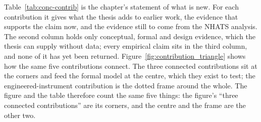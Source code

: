 Table~\ref{tab:conc-contrib} is the chapter's statement of what is new. For each
contribution it gives what the thesis adds to earlier work, the evidence that
supports the claim now, and the evidence still to come from the NHATS analysis.
The second column holds only conceptual, formal and design evidence, which the
thesis can supply without data; every empirical claim sits in the third column,
and none of it has yet been returned. Figure~\ref{fig:contribution_triangle}
shows how the same five contributions connect. The three connected contributions
sit at the corners and feed the formal model at the centre, which they exist to
test; the engineered-instrument contribution is the dotted frame around the
whole. The figure and the table therefore count the same five things: the
figure's ``three connected contributions'' are its corners, and the centre and
the frame are the other two.

